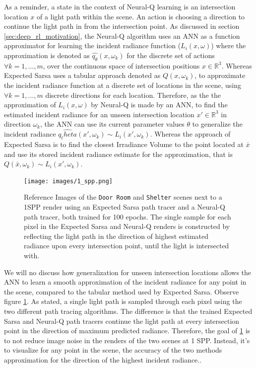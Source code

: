 \documentclass[../dissertation.tex]{subfiles}
\begin{document}
As a reminder, a state in the context of Neural-Q learning is an intersection location $x$ of a light path within the scene. An action is choosing a direction to continue the light path in from the intersection point. As discussed in section \ref{sec:deep_rl_motivation}, the Neural-Q algorithm uses an ANN as a function approximator for learning the incident radiance function ($L_i(x, \omega)$) where the approximation is denoted as $\hat{q_\theta}(x, \omega_k)$ for the discrete set of actions $\forall k = 1, ..., m$, over the continuous space of intersection positions $x \in \mathbb{R}^3$. Whereas Expected Sarsa uses a tabular approach denoted as $Q(x, \omega_k)$,  to approximate the incident radiance function at a discrete set of locations in the scene, using $\forall k = 1, ..., m$ discrete directions for each location. Therefore, as the the approximation of $L_i(x, \omega)$ by Neural-Q is made by an ANN, to find the estimated incident radiance for an unseen intersection location $x' \in \mathbb{R}^3$ in direction $\omega_k$, the ANN can use its current parameter values $\theta$  to generalize the incident radiance $\hat{q_theta}(x', \omega_k) \sim L_i(x', \omega_k)$. Whereas the approach of Expected Sarsa is to find the closest Irradiance Volume to the point located at $\bar{x}$ and use its stored incident radiance estimate for the approximation, that is $Q(\bar{x}, \omega_k) \sim L_i(x', \omega_k)$. 

\begin{figure}[h]
\centering
\texttt{[image: images/1\_spp.png]}   
\caption{Reference Images of the \verb|Door Room| and \verb|Shelter| scenes next to a 1SPP render using an Expected Sarsa path tracer and a Neural-Q path tracer, both trained for 100 epochs. The single sample for each pixel in the Expected Sarsa and Neural-Q renders is constructed by reflecting the light path in the direction of highest estimated radiance upon every intersection point, until the light is intersected with.}
\label{fig:1_spp_max_dir}
\end{figure}

We will no discuss how generalization for unseen intersection locations allows the ANN to learn a smooth approximation of the incident radiance for any point in the scene, compared to the tabular method used by Expected Sarsa. Observe figure \ref{fig:1_spp_max_dir}. As stated, a single light path is sampled through each pixel using the two different path tracing algorithms. The difference is that the trained Expected Sarsa and Neural-Q path tracers continue the light path at every intersection point in the direction of maximum predicted radiance. Therefore, the goal of \ref{fig:1_spp_max_dir} is to not reduce image noise in the renders of the two scenes at 1 SPP. Instead, it's to visualize for any point in the scene, the accuracy of the two methods approximation for the direction of the highest incident radiance.. 
\end{document}
